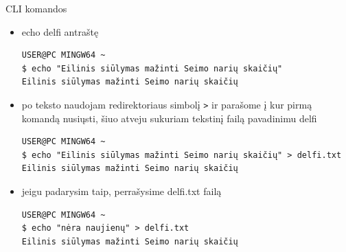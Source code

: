 \documentclass[11pt,xcolor=table]{beamer}
\begin{document}
\begin{frame}[fragile]{CLI komandos}

\begin{itemize}
\item echo delfi antraštę

\begin{lstlisting}
USER@PC MINGW64 ~
$ echo "Eilinis siūlymas mažinti Seimo narių skaičių"
Eilinis siūlymas mažinti Seimo narių skaičių
\end{lstlisting}

\item po teksto naudojam redirektoriaus  simbolį \colorbox{listinggray}{\lstinline|>|} ir parašome į kur pirmą komandą nusiųsti, šiuo atveju sukuriam tekstinį failą pavadinimu delfi 

\begin{lstlisting}
USER@PC MINGW64 ~
$ echo "Eilinis siūlymas mažinti Seimo narių skaičių" > delfi.txt
Eilinis siūlymas mažinti Seimo narių skaičių
\end{lstlisting}

\item jeigu padarysim taip, perrašysime delfi.txt failą
\begin{lstlisting}
USER@PC MINGW64 ~
$ echo "nėra naujienų" > delfi.txt
Eilinis siūlymas mažinti Seimo narių skaičių
\end{lstlisting}

\end{itemize}
\end{frame}
\end{document}
